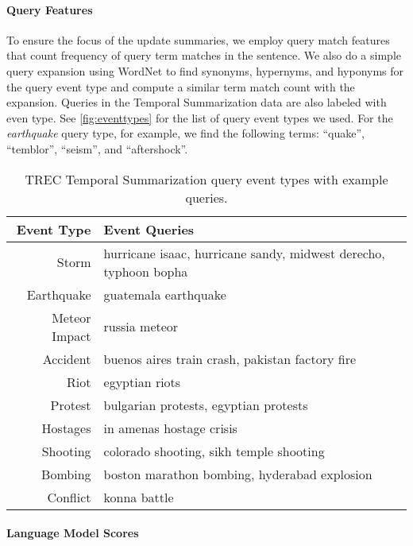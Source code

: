 \paragraph{Query Features} To ensure the focus of the update summaries,
we employ query match features that count frequency of query term matches
in the sentence. We also do a simple query expansion using WordNet 
\citep{miller1995wordnet}
to find  synonyms, hypernyms, and hyponyms for the query event type and compute
a similar term match count with the expansion.
Queries in the Temporal Summarization data are also labeled with even type.
See \autoref{fig:eventtypes} for the list of query event types we used. 
For the \emph{earthquake} query type, for example, we find the following terms:
``quake'', ``temblor'', ``seism'', and ``aftershock''.


\begin{table}
\begin{tabular}{r | l}
\textbf{Event Type} & \textbf{Event Queries} \\
\hline
Storm & hurricane isaac, hurricane sandy, midwest derecho, typhoon bopha\\
Earthquake & guatemala earthquake  \\
Meteor Impact & russia meteor \\
Accident & buenos aires train crash,  pakistan factory fire\\
Riot & egyptian riots\\
Protest & bulgarian protests, egyptian protests \\
Hostages & in amenas hostage crisis \\
Shooting & colorado shooting, sikh temple shooting\\
Bombing & boston marathon bombing, hyderabad explosion \\
Conflict & konna battle \\
\end{tabular}
\caption{TREC Temporal Summarization query event types with example queries.} 
\label{fig:eventtypes}
\end{table}

\paragraph{Language Model Scores}

